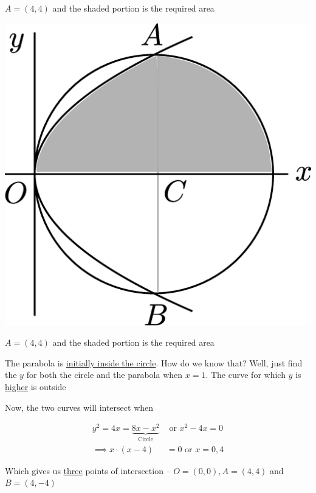\documentclass[14pt,fleqn]{extarticle}
\begin{document}
\begin{problem}
\begin{step}
\begin{options}
$A = \left(4,4 \right)$ and the shaded portion is the required area 
     \incorrect
        
        \begin{center}
\includegraphics[scale=0.2]{1381-D.eps}
\end{center}

$A = \left(4,4 \right)$ and the shaded portion is the required area 
    \end{options} 
     \reason 
     
     The parabola is \underline{initially inside the circle}. How do we know 
     that? Well, just find the $y$ for both the circle and the parabola 
     when $x=1$. The curve for which $y$ is \underline{higher} is outside\newline 
     
     Now, the two curves will intersect when 
     
     \begin{align}
     y^2 = 4x = \underbrace{8x-x^2}_{\text{Circle}}&\text{ or } x^2 - 4x = 0  \\
     \implies x\cdot \left(x-4 \right) &= 0\text{ or } x = 0,4 
\end{align}

Which gives us \underline{three} points of intersection -- $O = (0,0), A = (4,4)$ and $B=(4,-4)$ \newline 


\end{step}
\end{problem}
\end{document}
